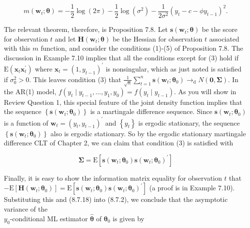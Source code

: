 \documentclass[10pt]{article}
\begin{document}
\begin{equation*}
m\left(\mathbf{w}_{t} ; \boldsymbol{\theta}\right)=-\frac{1}{2} \log (2 \pi)-\frac{1}{2} \log \left(\sigma^{2}\right)-\frac{1}{2 \sigma^{2}}\left(y_{t}-c-\phi y_{t-1}\right)^{2} . \tag{8.7.17}
\end{equation*}


The relevant theorem, therefore, is Proposition 7.8. Let $\mathbf{s}\left(\mathbf{w}_{t} ; \boldsymbol{\theta}\right)$ be the score for observation $t$ and let $\mathbf{H}\left(\mathbf{w}_{t} ; \boldsymbol{\theta}\right)$ be the Hessian for observation $t$ associated with this $m$ function, and consider the conditions (1)-(5) of Proposition 7.8. The discussion in Example 7.10 implies that all the conditions except for (3) hold if $\mathrm{E}\left(\mathbf{x}_{t} \mathbf{x}_{t}^{\prime}\right)$ where $\mathbf{x}_{t}=\left(1, y_{t-1}\right)^{\prime}$ is nonsingular, which as just noted is satisfied if $\sigma_{0}^{2}>0$. This leaves condition (3) that $\frac{1}{\sqrt{n}} \sum_{t=1}^{n} \mathbf{s}\left(\mathbf{w}_{t} ; \boldsymbol{\theta}_{0}\right) \rightarrow_{\mathrm{d}} N(\mathbf{0}, \boldsymbol{\Sigma})$. In the AR(1) model, $f\left(y_{t} \mid\right. \left.y_{t-1}, \ldots, y_{1}, y_{0}\right)=f\left(y_{t} \mid y_{t-1}\right)$. As you will show in Review Question 1, this special feature of the joint density function implies that the sequence $\left\{\mathbf{s}\left(\mathbf{w}_{t} ; \boldsymbol{\theta}_{0}\right)\right\}$ is a martingale difference sequence. Since $\mathbf{s}\left(\mathbf{w}_{t} ; \boldsymbol{\theta}_{0}\right)$ is a function of $\mathbf{w}_{t}=\left(y_{t}, y_{t-1}\right)^{\prime}$ and $\left\{y_{t}\right\}$ is ergodic stationary, the sequence $\left\{\mathbf{s}\left(\mathbf{w}_{t} ; \boldsymbol{\theta}_{0}\right)\right\}$ also is ergodic stationary. So by the ergodic stationary martingale difference CLT of Chapter 2, we can claim that condition (3) is satisfied with


\begin{equation*}
\boldsymbol{\Sigma}=\mathrm{E}\left[\mathbf{s}\left(\mathbf{w}_{t} ; \boldsymbol{\theta}_{0}\right) \mathbf{s}\left(\mathbf{w}_{t} ; \boldsymbol{\theta}_{0}\right)^{\prime}\right] \tag{8.7.18}
\end{equation*}


Finally, it is easy to show the information matrix equality for observation $t$ that $-\mathrm{E}\left[\mathbf{H}\left(\mathbf{w}_{t} ; \boldsymbol{\theta}_{0}\right)\right]=\mathrm{E}\left[\mathbf{s}\left(\mathbf{w}_{t} ; \boldsymbol{\theta}_{0}\right) \mathbf{s}\left(\mathbf{w}_{t} ; \boldsymbol{\theta}_{0}\right)^{\prime}\right]$ (a proof is in Example 7.10). Substituting this and (8.7.18) into (8.7.2), we conclude that the asymptotic variance of the\\
$y_{0}$-conditional ML estimator $\hat{\boldsymbol{\theta}}$ of $\boldsymbol{\theta}_{0}$ is given by
\end{document}
